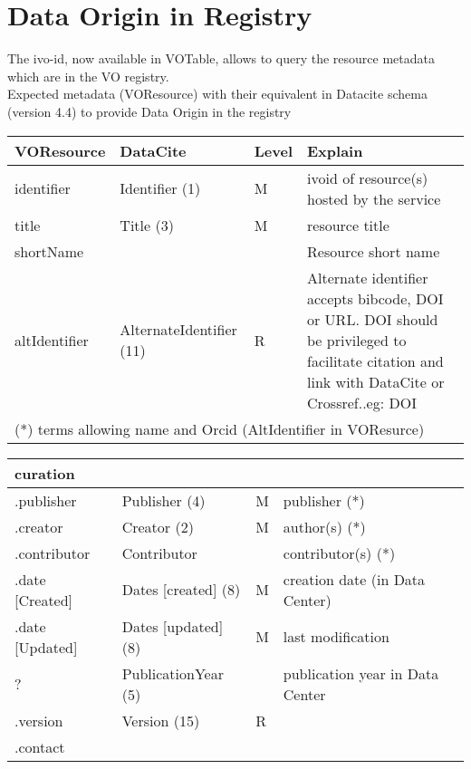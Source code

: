 \documentclass[11pt,a4paper]{ivoa}
\begin{document}
\section{Data Origin in Registry}
The ivo-id, now available in VOTable, allows to query the resource metadata which are in the VO registry.\\


Expected metadata (VOResource) with their equivalent in Datacite schema (version 4.4) to provide Data Origin in the registry\\

\begin{tabular}{|p{3cm}|p{4cm}|p{1cm}|p{5cm}|} \hline
\textbf{VOResource} & \textbf{DataCite} & \textbf{Level} & \textbf{Explain} \\ \hline
identifier    &Identifier (1) &M & ivoid of resource(s) hosted by the service\\ \hline
title         &Title (3) &M  & resource title\\ \hline
shortName     &&& Resource short name\\ \hline
altIdentifier & AlternateIdentifier (11)& R & 
              Alternate identifier accepts bibcode, DOI or URL. DOI should be privileged to facilitate citation and link with DataCite or Crossref..eg: DOI \\ \hline
\multicolumn{4}{l}{(*) terms allowing name and Orcid (AltIdentifier in VOResurce)} \\ 
\end{tabular}

\begin{tabular}{|p{3cm}|p{4cm}|p{1cm}|p{5cm}|} \hline
\multicolumn{4}{|l|}{\textbf{curation}} \\ \hline
.publisher     & Publisher (4) & M &publisher (*)\\ \hline
.creator       & Creator (2) & M & author(s) (*)\\ \hline
.contributor   & Contributor & & contributor(s) (*)\\ \hline
.date [Created]& Dates [created] (8)& M & creation date (in Data Center)\\ \hline
.date [Updated]& Dates [updated] (8)& M & last modification\\ \hline
  ?            & PublicationYear (5) & & publication year in Data Center\\ \hline
.version       & Version (15) & R &\\ \hline
.contact       & &&\\ \hline
\end{tabular}
\end{document}
